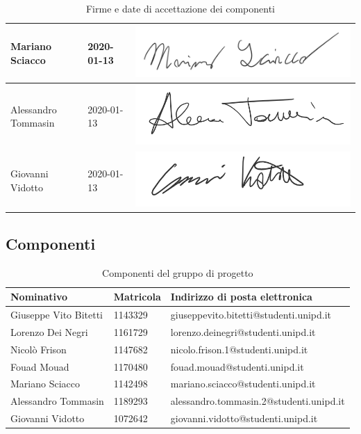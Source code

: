 \begin{table}[H]
\begin{tabular}{|l|l|l|}
					Mariano Sciacco & 2020-01-13 & \includegraphics[scale=0.6]{images/firme/mariano}  \\ \hline
					Alessandro Tommasin & 2020-01-13 & \includegraphics[scale=0.6]{images/firme/alessandro} \\ \hline
					Giovanni Vidotto & 2020-01-13 & \includegraphics[scale=0.6]{images/firme/giovanni} \\ \hline
				\end{tabular}
				\caption{Firme e date di accettazione dei componenti}
			\end{table}
			
		\subsection{Componenti}
			
			\begin{table}[H]
				\centering
				\begin{tabular}{|l|l|l|}
					\hline
					\textbf{Nominativo} & \textbf{Matricola} & \textbf{Indirizzo di posta elettronica} \\ \hline
					Giuseppe Vito Bitetti & 1143329 & giuseppevito.bitetti@studenti.unipd.it \\ \hline
					Lorenzo Dei Negri & 1161729 & lorenzo.deinegri@studenti.unipd.it \\ \hline
					Nicolò Frison & 1147682 & nicolo.frison.1@studenti.unipd.it \\ \hline
					Fouad Mouad & 1170480 & fouad.mouad@studenti.unipd.it \\ \hline
					Mariano Sciacco & 1142498 & mariano.sciacco@studenti.unipd.it \\ \hline
					Alessandro Tommasin & 1189293 & alessandro.tommasin.2@studenti.unipd.it \\ \hline
					Giovanni Vidotto & 1072642 & giovanni.vidotto@studenti.unipd.it \\ \hline
				\end{tabular}
				\caption{Componenti del gruppo di progetto}
			\end{table}
		
